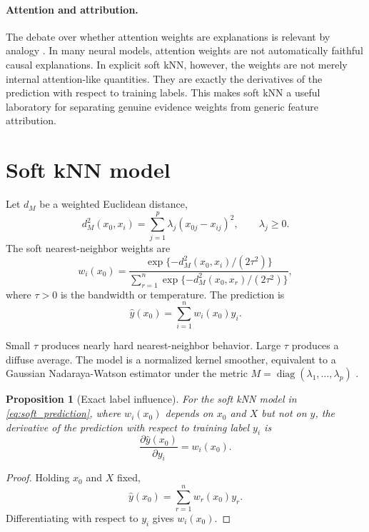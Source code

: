 \documentclass[11pt]{article}
\newtheorem{proposition}{Proposition}
\newcommand{\1}{\mathbf{1}}
\newcommand{\diag}{\operatorname{diag}}
\begin{document}
\paragraph{Attention and attribution.} The debate over whether attention weights are explanations is relevant by analogy \citep{jain2019attention,wiegreffe2019attention}. In many neural models, attention weights are not automatically faithful causal explanations. In explicit soft kNN, however, the weights are not merely internal attention-like quantities. They are exactly the derivatives of the prediction with respect to training labels. This makes soft kNN a useful laboratory for separating genuine evidence weights from generic feature attribution.

\section{Soft kNN model}

Let $d_M$ be a weighted Euclidean distance,
\begin{equation}
 d_M^2(x_0,x_i)=\sum_{j=1}^p \lambda_j(x_{0j}-x_{ij})^2,
 \qquad \lambda_j\ge 0.
 \label{eq:weighted_distance}
\end{equation}
The soft nearest-neighbor weights are
\begin{equation}
 w_i(x_0)=\frac{\exp\{-d_M^2(x_0,x_i)/(2\tau^2)\}}
 {\sum_{r=1}^n \exp\{-d_M^2(x_0,x_r)/(2\tau^2)\}},
 \label{eq:soft_weight}
\end{equation}
where $\tau>0$ is the bandwidth or temperature. The prediction is
\begin{equation}
 \hat y(x_0)=\sum_{i=1}^n w_i(x_0)y_i.
 \label{eq:soft_prediction}
\end{equation}

Small $\tau$ produces nearly hard nearest-neighbor behavior. Large $\tau$ produces a diffuse average. The model is a normalized kernel smoother, equivalent to a Gaussian Nadaraya-Watson estimator under the metric $M=\diag(\lambda_1,\ldots,\lambda_p)$ \citep{nadaraya1964estimating,watson1964smooth}.

\begin{proposition}[Exact label influence]
For the soft kNN model in \eqref{eq:soft_prediction}, where $w_i(x_0)$ depends on $x_0$ and $X$ but not on $y$, the derivative of the prediction with respect to training label $y_i$ is
\[
\frac{\partial \hat y(x_0)}{\partial y_i}=w_i(x_0).
\]
\end{proposition}

\begin{proof}
Holding $x_0$ and $X$ fixed,
\[
\hat y(x_0)=\sum_{r=1}^n w_r(x_0)y_r.
\]
Differentiating with respect to $y_i$ gives $w_i(x_0)$.
\end{proof}
\end{document}
